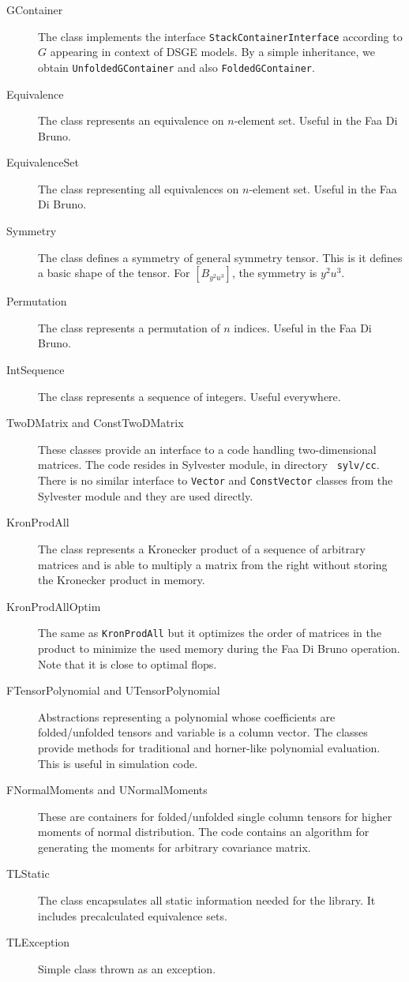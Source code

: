 \documentclass[11pt,a4paper]{article}
\begin{document}
\begin{description}
\item[GContainer]
The class implements the interface \texttt{StackContainerInterface} according
to $G$ appearing in context of DSGE models. By a simple inheritance,
we obtain \texttt{UnfoldedGContainer} and also \texttt{FoldedGContainer}.
\item[Equivalence]
The class represents an equivalence on $n$-element set. Useful in the
Faa Di Bruno.
\item[EquivalenceSet]
The class representing all equivalences on $n$-element set. Useful in the
Faa Di Bruno.
\item[Symmetry]
The class defines a symmetry of general symmetry tensor. This is it
defines a basic shape of the tensor. For $\left[B_{y^2u^3}\right]$,
the symmetry is $y^2u^3$.
\item[Permutation]
The class represents a permutation of $n$ indices. Useful in the
Faa Di Bruno.
\item[IntSequence]
The class represents a sequence of integers. Useful everywhere.
\item[TwoDMatrix and ConstTwoDMatrix]
These classes provide an interface to a code handling two-dimensional
matrices. The code resides in Sylvester module, in directory {\tt
sylv/cc}. There is
no similar interface to \texttt{Vector} and \texttt{ConstVector} classes from the
Sylvester module and they are used directly.
\item[KronProdAll]
The class represents a Kronecker product of a sequence of arbitrary
matrices and is able to multiply a matrix from the right without
storing the Kronecker product in memory.
\item[KronProdAllOptim]
The same as \texttt{KronProdAll} but it optimizes the order of matrices in
the product to minimize the used memory during the Faa Di Bruno
operation. Note that it is close to optimal flops.
\item[FTensorPolynomial and UTensorPolynomial]
Abstractions representing a polynomial whose coefficients are
folded/unfolded tensors and variable is a column vector. The classes
provide methods for traditional and horner-like polynomial
evaluation. This is useful in simulation code.
\item[FNormalMoments and UNormalMoments]
These are containers for folded/unfolded single column tensors for
higher moments of normal distribution. The code contains an algorithm
for generating the moments for arbitrary covariance matrix.
\item[TLStatic]
The class encapsulates all static information needed for the
library. It includes precalculated equivalence sets.
\item[TLException]
Simple class thrown as an exception.
\end{description}
\end{document}
